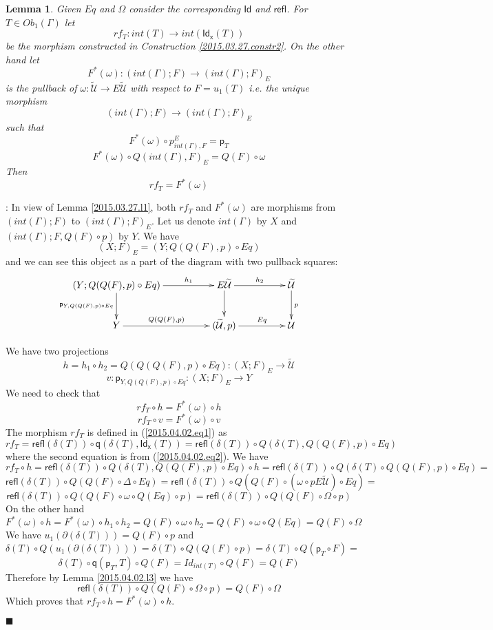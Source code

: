 \documentclass[12pt]{article}
\numberwithin{equation}{section}
\newenvironment{myproof}{{\bf Proof}:}{$\blacksquare$ \vskip 5mm }
\newtheorem{lemma}[proposition]{Lemma}
\newcommand{\llabel}[1]{\label{#1}}
\newcommand{\sr}{\rightarrow}
\newcommand{\wt}{\widetilde}
\newcommand{\p}{\mathsf{p}}
\newcommand{\q}{\mathsf{q}}
\newcommand{\Id}{\mathsf{Id}} %
\newcommand{\refl}{\mathsf{refl}}
\newcommand{\Idx}{\mathsf{Id_x}} %
\newcommand{\U}{\mathcal{U}}
\begin{document}
\begin{lemma}
\llabel{2015.03.31.l2} Given $Eq$ and $\Omega$ consider the corresponding $\Id$
and $\refl$. For $T\in Ob_1(\Gamma)$ let %
$$rf_T:int(T)\sr int(\Idx(T))$$
%
be the morphism constructed in Construction \ref{2015.03.27.constr2}. On the
other hand let
%
$$F^*(\omega):(int(\Gamma);F)\sr (int(\Gamma);F)_{E}$$
%
is the pullback of $\omega:\wt{\U}\sr E\wt{\U}$ with respect to $F=u_1(T)$
i.e. the unique morphism
%
$$(int(\Gamma);F)\sr (int(\Gamma);F)_{E}$$
%
such that
%
$$F^*(\omega)\circ p^{E}_{int(\Gamma),F}=\p_{T}$$
$$F^*(\omega)\circ Q(int(\Gamma),F)_{E}=Q(F)\circ \omega$$
%
Then
%
$$rf_T=F^*(\omega)$$
%
\end{lemma}
%
\begin{myproof}
In view of Lemma \ref{2015.03.27.l1}, both $rf_T$ and $F^*(\omega)$ are
morphisms from $(int(\Gamma);F)$ to $(int(\Gamma);F)_{E}$. Let us denote
$int(\Gamma)$ by $X$ and $(int(\Gamma);F,Q(F)\circ p)$ by $Y$. We have
%
$$(X;F)_{E}=(Y;Q(Q(F),p)\circ Eq)$$
%
and we can see this object as a part of the diagram with two pullback squares:
%
$$
\begin{xy}
          \xymatrix@C=4pc{ (Y;Q(Q(F),p)\circ Eq) \ar[r]^-{h_1} \ar[d]_{\p_{Y,
                Q(Q(F),p)\circ Eq}} & E\wt{\U} \ar[r]^-{h_2} \ar[d] & \wt{\U}
            \ar[d]^{p} \\ Y \ar[r]^-{Q(Q(F),p)} & (\wt{\U},p) \ar[r]^-{Eq} & \U }
\end{xy}
$$

%
We have two projections
%
$$h=h_1\circ h_2=Q(Q(Q(F),p)\circ Eq):(X;F)_{E}\sr \wt{\U}$$
$$v:\p_{Y,Q(Q(F),p)\circ Eq}:(X;F)_{E} \sr Y$$
%
We need to check that
%
$$rf_T\circ h=F^*(\omega)\circ h$$
$$rf_T\circ v =F^*(\omega)\circ v$$
%
The morphism $rf_T$ is defined in (\ref{2015.04.02.eq1}) as
%
$$rf_T=\refl(\delta(T))\circ \q(\delta(T),\Idx(T))=\refl(\delta(T))\circ
Q(\delta(T),Q(Q(F),p)\circ Eq)$$
%
where the second equation is from (\ref{2015.04.02.eq2}).
%
We have
%
$$rf_T\circ h = \refl(\delta(T))\circ Q(\delta(T),Q(Q(F),p)\circ Eq)\circ
h=\refl(\delta(T))\circ Q(\delta(T)\circ Q(Q(F),p)\circ
Eq)=$$$$\refl(\delta(T))\circ Q(Q(F)\circ \Delta\circ Eq)=\refl(\delta(T))\circ
Q(Q(F)\circ (\omega\circ pE\wt{\U})\circ Eq)=$$
$$\refl(\delta(T))\circ Q(Q(F)\circ \omega\circ Q(Eq)\circ
p)=\refl(\delta(T))\circ Q(Q(F)\circ \Omega\circ p)$$
%
On the other hand
%
$$F^*(\omega)\circ h=F^*(\omega)\circ h_1\circ h_2=Q(F)\circ \omega\circ
h_2=Q(F)\circ \omega\circ Q(Eq)=Q(F)\circ \Omega$$
%
We have $u_1(\partial(\delta(T)))=Q(F)\circ p$ and
%
$$\delta(T)\circ Q(u_1(\partial(\delta(T))))=\delta(T)\circ Q(Q(F)\circ p)=
\delta(T)\circ Q(\p_T\circ F)=$$
$$\delta(T)\circ \q(\p_T,T)\circ Q(F)=Id_{int(T)}\circ Q(F)=Q(F)$$
%
Therefore by Lemma \ref{2015.04.02.l3} we have
%
$$\refl(\delta(T))\circ Q(Q(F)\circ \Omega\circ p)=Q(F)\circ \Omega$$
%
Which proves that $rf_T\circ h=F^*(\omega)\circ h$.


\end{myproof}
\end{document}
